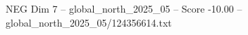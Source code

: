 \begin{textsample}{NEG Dim 7 – global\_north\_2025\_05 – Score -10.00 – global\_north\_2025\_05/124356614.txt}
\end{textsample}
